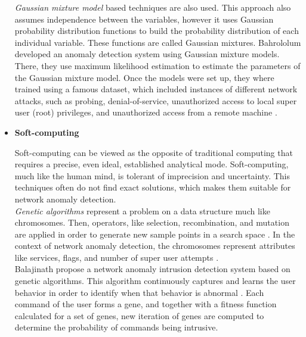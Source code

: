 \begin{itemize}
\textit{Gaussian mixture model} based techniques are also used. This approach also assumes independence between the variables, however it uses Gaussian probability distribution functions to build the probability distribution of each individual variable. These functions are called Gaussian mixtures. Bahrololum \etAl \cite{Bahrololum2008} developed an anomaly detection system using Gaussian mixture models. There, they use maximum likelihood estimation to estimate the parameters of the Gaussian mixture model. Once the models were set up, they where trained using a famous dataset, which included instances of different network attacks, such as probing, denial-of-service, unauthorized access to local super user (root) privileges, and unauthorized access from a remote machine \cite{Bahrololum2008}. \\


		\item \textbf{Soft-computing}
		
		
Soft-computing can be viewed as the opposite of traditional computing that requires a precise, even ideal, established analytical mode. Soft-computing, much like the human mind, is tolerant of imprecision and uncertainty. This techniques often do not find exact solutions, which makes them suitable for network anomaly detection.\\

\textit{Genetic algorithms} represent a problem on a data structure much like chromosomes. Then, operators, like selection, recombination, and mutation are applied in order to generate new sample points in a search space \cite{geneticAlgos}. 
In the context of network anomaly detection, the chromosomes represent attributes like services, flags, and number of super user attempts \cite{Bhattacharyya:2013:NAD:2505468}. \\	
Balajinath \etAl propose a network anomaly intrusion detection system based on genetic algorithms. This algorithm continuously captures and learns the user behavior in order to identify when that behavior is abnormal \cite{Balajinath:2001:IDT:2294491.2294970}. Each command of the user forms a gene, and together with a fitness function calculated for a set of genes, new iteration of genes are computed to determine the probability of commands being intrusive.\\


\end{itemize}
